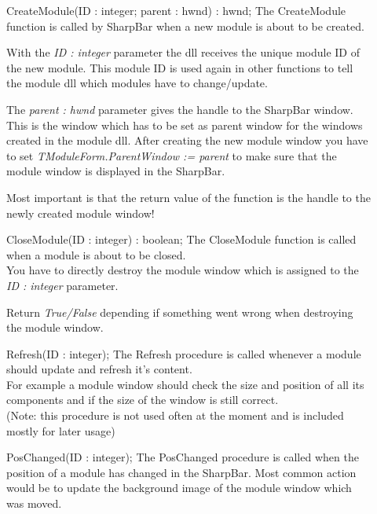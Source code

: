 \documentclass[a4paper]{article}
\begin{document}
  \medskip
  \begin{description}
    \item[]{ CreateModule(ID : integer; parent : hwnd) : hwnd;}  \medbreak    
      The CreateModule function is called by SharpBar when a new module is about to be created. 

      With the {\it ID : integer} parameter the dll receives the unique module ID of the new module. This module ID is used again in other functions to tell the module dll which modules have to change/update. 

      The {\it parent : hwnd} parameter gives the handle to the SharpBar window. This is the window which has to be set as parent window for the windows created in the module dll. After creating the new module window you have to set {\it TModuleForm.ParentWindow := parent} to make sure that the module window is displayed in the SharpBar. 

      Most important is that the return value of the function is the handle to the newly created module window! 
      
      \bigbreak
    \item[]{ CloseModule(ID : integer) : boolean;}  \medbreak
      The CloseModule function is called when a module is about to be closed. \\
      You have to directly destroy the module window which is assigned to the {\it ID : integer} parameter. 

      Return {\it True/False} depending if something went wrong when destroying the module window.     
      
      \bigbreak
    \item[]{ Refresh(ID : integer);}  \medbreak
      The Refresh procedure is called whenever a module should update and refresh it's content. \\
      For example a module window should check the size and position of all its components and if the size of the window is still correct.\\
      (Note: this procedure is not used often at the moment and is included mostly for later usage)
      
      \bigbreak
    \item[]{ PosChanged(ID : integer);}  \medbreak
      The PosChanged procedure is called when the position of a module has changed in the SharpBar. Most common action would be to update the background image of the module window which was moved. 
      

\end{description}
\end{document}
